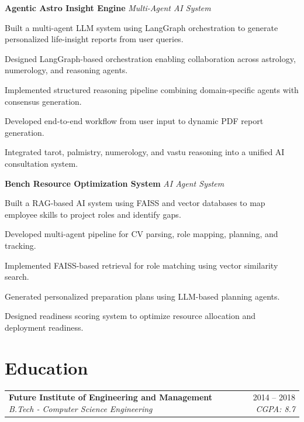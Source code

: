 \documentclass[10pt, letterpaper]{article}
\makeatletter
\newcommand{\resumeitem}[1]{\item\small{#1}}
\newcommand{\jobheading}[4]{%
  \noindent
  \begin{tabularx}{\textwidth}{@{}X r@{}}
    \textbf{\color{primary}#1} \textbar{} \textit{\small\color{subtle}#2} &
    \small\color{subtle}#3 \textbar{} \textit{\small #4}
  \end{tabularx}%
}
\makeatother
\begin{document}
\noindent\textbf{Agentic Astro Insight Engine} \textemdash{} \textit{Multi-Agent AI System}

\begin{projectitems}
\resumeitem{Built a multi-agent LLM system using LangGraph orchestration to generate personalized life-insight reports from user queries.}
\resumeitem{Designed LangGraph-based orchestration enabling collaboration across astrology, numerology, and reasoning agents.}
\resumeitem{Implemented structured reasoning pipeline combining domain-specific agents with consensus generation.}
\resumeitem{Developed end-to-end workflow from user input to dynamic PDF report generation.}
\resumeitem{Integrated tarot, palmistry, numerology, and vastu reasoning into a unified AI consultation system.}
\end{projectitems}

\noindent\textbf{Bench Resource Optimization System} \textemdash{} \textit{AI Agent System}

\begin{projectitems}
\resumeitem{Built a RAG-based AI system using FAISS and vector databases to map employee skills to project roles and identify gaps.}
\resumeitem{Developed multi-agent pipeline for CV parsing, role mapping, planning, and tracking.}
\resumeitem{Implemented FAISS-based retrieval for role matching using vector similarity search.}
\resumeitem{Generated personalized preparation plans using LLM-based planning agents.}
\resumeitem{Designed readiness scoring system to optimize resource allocation and deployment readiness.}
\end{projectitems}

\section{Education}

\jobheading{Future Institute of Engineering and Management}{B.Tech - Computer Science Engineering}{2014 -- 2018}{CGPA: 8.7}
\end{document}
